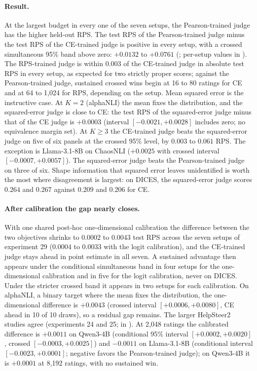 \paragraph{Result.}
At the largest budget in every one of the seven setups, the Pearson-trained judge has the higher held-out RPS.
The test RPS of the Pearson-trained judge minus the test RPS of the CE-trained judge is positive in every setup, with a crossed simultaneous 95\% band above zero: $+0.0132$ to $+0.0761$ (; per-setup values in ).
The RPS-trained judge is within $0.003$ of the CE-trained judge in absolute test RPS in every setup, as expected for two strictly proper scores; against the Pearson-trained judge, sustained crossed wins begin at 16 to 80 ratings for CE and at 64 to 1{,}024 for RPS, depending on the setup.
Mean squared error is the instructive case.
At $K=2$ (alphaNLI) the mean fixes the distribution, and the squared-error judge is close to CE: the test RPS of the squared-error judge minus that of the CE judge is $+0.0003$ (interval $[-0.0021,+0.0028]$ includes zero; no equivalence margin set).
At $K\ge3$ the CE-trained judge beats the squared-error judge on five of six panels at the crossed 95\% level, by $0.003$ to $0.061$ RPS.
The exception is Llama-3.1-8B on ChaosNLI ($+0.0025$ with crossed interval $[-0.0007,+0.0057]$).
The squared-error judge beats the Pearson-trained judge on three of six.
Shape information that squared error leaves unidentified is worth the most where disagreement is largest: on DICES, the squared-error judge scores $0.264$ and $0.267$ against $0.209$ and $0.206$ for CE.

\paragraph{After calibration the gap nearly closes.}
With one shared post-hoc one-dimensional calibration the difference between the two objectives shrinks to $0.0002$ to $0.0043$ test RPS across the seven setups of experiment 29 ($0.0004$ to $0.0033$ with the logit calibration), and the CE-trained judge stays ahead in point estimate in all seven.
A sustained advantage then appears under the conditional simultaneous band in four setups for the one-dimensional calibration and in five for the logit calibration, never on DICES.
Under the stricter crossed band it appears in two setups for each calibration.
On alphaNLI, a binary target where the mean fixes the distribution, the one-dimensional difference is $+0.0043$ (crossed interval $[+0.0006,+0.0080]$, CE ahead in 10 of 10 draws), so a residual gap remains.
The larger HelpSteer2 studies agree (experiments 24 and 25;  in ).
At 2{,}048 ratings the calibrated difference is $+0.0011$ on Qwen3-4B (conditional 95\% interval $[+0.0002,+0.0020]$, crossed $[-0.0003,+0.0025]$) and $-0.0011$ on Llama-3.1-8B (conditional interval $[-0.0023,+0.0001]$; negative favors the Pearson-trained judge); on Qwen3-4B it is $+0.0001$ at 8{,}192 ratings, with no sustained win.

